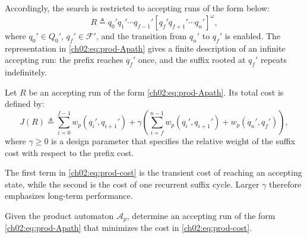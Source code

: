 Accordingly, the search is restricted to accepting runs of the form below:
\begin{equation}
R \triangleq
q_0' q_1' \cdots q_{f-1}'
\left[q_f' q_{f+1}' \cdots q_n'\right]^{\omega},
\label{ch02:eq:prod-Apath}
\end{equation}
where $q_0' \in Q_0'$,
$q_f' \in \mathcal{F}'$, and the transition from $q_n'$ to $q_f'$ is enabled.
The representation in \eqref{ch02:eq:prod-Apath} gives a finite description of
an infinite accepting run: the prefix reaches $q_f'$ once, and the suffix rooted
at $q_f'$ repeats indefinitely.

\begin{definition}
\label{ch02:def:run_cost}
Let $R$ be an accepting run of the form
\eqref{ch02:eq:prod-Apath}. Its total cost is defined by:
\begin{equation}
J(R)
\triangleq
\sum_{i=0}^{f-1} w_p(q_i',q_{i+1}')
+
\gamma
\left(
\sum_{i=f}^{n-1} w_p(q_i',q_{i+1}')
+
w_p(q_n',q_f')
\right),
\label{ch02:eq:prod-cost}
\end{equation}
where $\gamma \geq 0$ is a design parameter that specifies the relative weight
of the suffix cost with respect to the prefix cost.
\end{definition}

The first term in \eqref{ch02:eq:prod-cost} is the transient cost of reaching
an accepting state, while the second is the cost of one recurrent suffix cycle.
Larger $\gamma$ therefore emphasizes long-term performance.

\begin{problem}
\label{ch02:pro:opt-search}
Given the product automaton $\mathcal{A}_p$, determine an accepting run of the
form \eqref{ch02:eq:prod-Apath} that minimizes the cost in
\eqref{ch02:eq:prod-cost}.
\end{problem}

